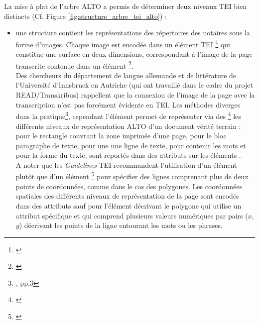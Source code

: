 La mise à plat de l'arbre ALTO a permis de déterminer deux niveaux TEI bien distincts (Cf. Figure \ref{fig:structure_arbre_tei_alto}) : 
\begin{itemize}
    \item une structure  contient les représentations des répertoires des notaires sous la forme d'images. Chaque image est encodée dans un élément TEI \footnote{\cite{tei_tei_nodate-15}} qui constitue une surface en deux dimensions, correspondant à l'image de la page transcrite contenue dans un élément \footnote{\cite{tei_tei_nodate-14}}.\\
    Des chercheurs du département de langue allemande et de littérature de l'Université d'Innsbruck en Autriche (qui ont travaillé dans le cadre du projet READ/Transkribus) rappellent que la connexion de l'image de la page avec la transcription n'est pas forcément évidente en TEI. Les méthodes diverges dans la pratique\footnote{\cite{muhlberger_preprint_nodate}, pp.3}, cependant l'élément  permet de représenter via des  \footnote{\cite{tei_tei_nodate-13}} les différents niveaux de représentation ALTO d'un document vérité terrain :  pour le rectangle couvrant la zone imprimée d'une page,  pour le bloc paragraphe de texte,  pour une une ligne de texte,  pour contenir les mots et  pour la forme du texte, sont reportés dans des attributs  sur les éléments .\\
    A noter que les \textit{Guidelines} TEI recommandent l'utilisation d'un élément  plutôt que d'un élément \footnote{\cite{tei_tei_nodate-12}} pour spécifier des lignes comprenant plus de deux points de coordonnées, comme dans le cas des polygones. Les coordonnées spatiales des différents niveaux de représentation de la page sont encodés dans des attributs  sauf pour l'élément  décrivant le polygone qui utilise un attribut  spécifique et qui comprend plusieurs valeurs numériques par pairs ($x$,$y$) décrivant les points de la ligne entourant les mots ou les phrases.\\

\end{itemize}
